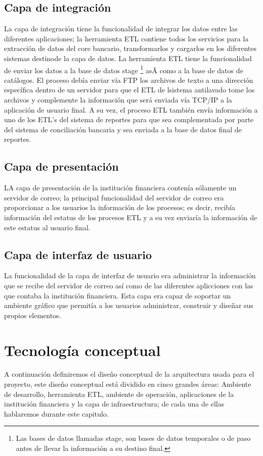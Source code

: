 \documentclass[a4paper,openright,12pt]{book}
\begin{document}
\subsection{Capa de integración}
La capa de integración tiene la funcionalidad de integrar los datos entre las diferentes aplicaciones; la herramienta ETL contiene todos los servicios para la extracción de datos del core bancario, transformarlos y cargarlos en los diferentes sistemas destinode la capa de datos. La herramienta ETL tiene la funcionalidad de enviar los datos a la base de datos stage \footnote{Las bases de datos llamadas stage, son bases de datos temporales o de paso antes de llevar la información a su destino final.} asÃ­ como a la base de datos de catálogos. El proceso debía enviar vía FTP los archivos de texto a una dirección específica dentro de un servidor para que el ETL de lsistema antilavado tome los archivos y complemente la información que será enviada vía TCP/IP a la aplicación de usuario final. A su vez, el proceso ETL también envía información a uno de los ETL's del sistema de reportes para que sea complementada por parte del sistema de conciliación bancaria y sea enviada a la base de datos final de reportes.

\subsection{Capa de presentación}
LA capa de presentación de la institución financiera contenía sólamente un servidor de correo; la principal funcionalidad del servidor de correo era proporcionar a los usuarios la información de los procesos; es decir, recibía información del estatus de los procesos ETL y a su vez enviaría la información de este estatus al usuario final.

\subsection{Capa de interfaz de usuario}
La funcionalidad de la capa de interfaz de usuario era administrar la información que se recibe del servidor de correo así como de las diferentes aplicciones con las que contaba la institución financiera. Esta capa era capaz de soportar un ambiente gráfico que permitía a los usuarios administrar, construir y diseñar sus propios elementos. 

\section{Tecnología conceptual}
A continuación definiremos el diseño conceptual de la arquitectura usada para el proyecto, este diseño conceptual está dividido en cinco grandes áreas: Ambiente de desarrollo, herramienta ETL, ambiente de operación, aplicaciones de la institución financiera y la capa de infraestructura; de cada una de ellas hablaremos durante este capitulo. 
\end{document}
